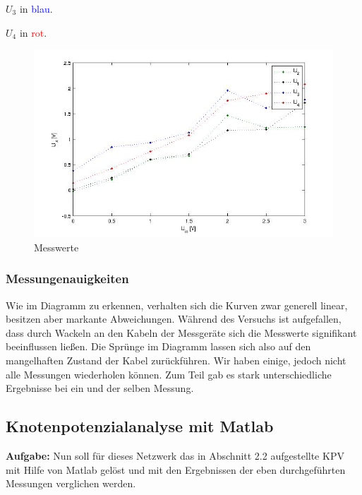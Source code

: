 \documentclass[10pt]{report}
\begin{document}
        $U_3$ in \textcolor{blue}{blau}.

        $U_4$ in \textcolor{red}{rot}.
        \begin{center}
            \begin{figure}[H]
                \includegraphics[width=\textwidth]{KPVmess.jpg}
              \caption{Messwerte}
            \end{figure}
        \end{center}

        \subsubsection{Messungenauigkeiten}
        Wie im Diagramm zu erkennen, verhalten sich die Kurven zwar generell linear,
        besitzen aber markante Abweichungen. Während des Versuchs ist aufgefallen,
        dass durch Wackeln an den Kabeln der Messgeräte sich die Messwerte
        signifikant beeinflussen ließen. Die Sprünge im Diagramm lassen sich
        also auf den mangelhaften Zustand der Kabel zurückführen. Wir haben einige,
        jedoch nicht alle Messungen wiederholen können. Zum Teil gab es stark
        unterschiedliche Ergebnisse bei ein und der selben Messung.


        \subsection{Knotenpotenzialanalyse mit Matlab}
        \textbf{Aufgabe:} Nun soll für dieses Netzwerk das in Abschnitt 2.2 aufgestellte KPV mit Hilfe von Matlab
        gelöst und mit den Ergebnissen der eben durchgeführten Messungen verglichen werden.

        \vspace{0.5cm}
\end{document}
